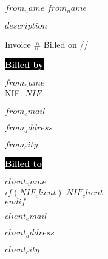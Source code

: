\documentclass[spanish,$fontsize$, a4paper]{article}
\begin{document}
%
$from_name$
{\Large \textbf{$from_name$}}\\ %

\hspace{10pt}

\textbf{$description$} \\

\hspace{10pt}

Invoice \# {\twodigit{\the\year}}{\twodigit{\the\month}}{\the\day}
\hfill
Billed on {\twodigit{\the\day}}/{\shortmonthname}/{\the\year}

\hspace{10pt}

 \begin{minipage}[t]{0.5\textwidth}
    \begin{flushleft}
    
    \colorbox{black}{{\textcolor{white}{\textbf{Billed by}}}}
    \vspace{5pt}
    
		$from_name$\\
		\vspace{3pt}
		NIF: $NIF$\\
		\vspace{3pt}
    	
    
        $from_email$\\
        		\vspace{3pt}
        

		$from_address$\\
				\vspace{3pt}

		$from_city$
				\vspace{3pt}
    \end{flushleft}
\end{minipage}%
%
\begin{minipage}[t]{0.5\textwidth}
    \begin{flushright}
    
\colorbox{black}{{\textcolor{white}{\textbf{Billed to}}}}
\vspace{5pt}

		$client_name$\\
		\vspace{3pt}
      $if(NIF_client)$
    $NIF_client$\\
			\vspace{3pt}
  $endif$


	
	     $client_email$\\
		\vspace{3pt}

	$client_address$\\
		\vspace{3pt}

	$client_city$
			\vspace{3pt}
    \end{flushright}
\end{minipage}%
\end{document}
